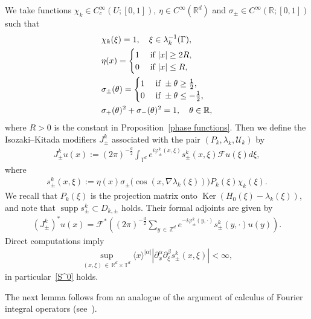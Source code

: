 \documentclass[AHL,Unicode,longabstracts,published]{cedram}
\makeatletter
\renewcommand{\a}{\alpha}
\renewcommand{\b}{\beta}
\newcommand{\f}{\varphi}
\renewcommand{\l}{\lambda}
\newcommand{\x}{\xi}
\newcommand{\s}{\sigma}
\newcommand{\R}{\mathbb{R}}
\newcommand{\Z}{\mathbb{Z}}
\newcommand{\T}{\mathbb{T}}
\newcommand{\US}{\mathcal{U}}
\newcommand{\FS}{\mathcal{F}}
\newcommand{\jap}[1]{\langle #1 \rangle}
\DeclareMathOperator{\kerr}{Ker}
\DeclareMathOperator{\supp}{supp}
\newenvironment{alcases}{\left\{\begingroup\arraycolsep=0pt\renewcommand{\arraystretch}{1.2}\begin{array}{r@{\;}l@{\quad}l}}{\end{array}\endgroup\right.}
\newcommand{\Z}{\mathbb{Z}}
\newcommand{\R}{\mathbb{R}}
\makeatother
\begin{document}
We take functions $\chi_k\in C_c^\infty(U;[0,1])$, $\eta\in C^\infty(\R^d)$ and $\s_\pm\in C^\infty(\R;[0,1])$ such that
\begin{align}
&\chi_k(\x)=1, \quad \x \in \lambda_k^{-1}(\Gamma), \label{chi 1}
\\
&\eta(x)=
\begin{alcases}
1 & \quad \text{if } |x|\geq 2R, \\
0 & \quad \text{if } |x|\leq R,
\end{alcases}\label{eta 01}
\\
&\s_\pm(\theta)=
\begin{alcases}
1 & \quad \text{if } \pm\theta \geq \frac{1}{2}, \\ 0 & \quad \text{if } \pm\theta \leq -\frac{1}{2},
\end{alcases}\label{sigma 01}
\\
&\s_+(\theta)^2+\s_-(\theta)^2=1, \quad \theta\in\R, \label{sigma sum1}
\end{align}
where $R>0$ is the constant in Proposition~\ref{phase functions}. Then we define the Isozaki--Kitada modifiers $J_\pm^k$ associated with the pair $(P_k,\l_k,\US_k)$ by
\begin{align}\label{IK1}
J_\pm^k u(x) := (2\pi)^{-\frac{d}{2}} \int_{\T^d} e^{i\f_{\pm}^k(x,\x)} s_\pm^k(x,\x) \FS u(\x) d\x,
\end{align}
where
\begin{align*}
s_\pm^k(x,\x):=\eta(x)\s_\pm\bigl(\cos(x,\nabla\l_k(\x)) \bigr) P_k(\x) \chi_k(\x).
\end{align*}
We recall that $P_k(\x)$ is the projection matrix onto $\kerr(H_0(\x)-\l_k(\x))$, and note that $\supp s_\pm^k \subset D_{k,\pm}$ holds. Their formal adjoints are given by
\begin{align*}
\left(J_\pm^k\right)^* u(x) = \FS^* \left((2\pi)^{-\frac{d}{2}} \sum_{y\,\in\,\Z^d} e^{-i\f_{\pm}^k(y,\cdot)} s_\pm^k(y,\cdot) u(y) \right).
\end{align*}
Direct computations imply
\begin{align}\label{s is in S^0}
\sup_{(x,\x)\,\in\,\R^d\times\T^d}\jap{x}^{|\a|}\left|\partial_x^\a\partial_{\x}^\b s_\pm^k(x,\x)\right| < \infty,
\end{align}
in particular~\eqref{S^0} holds.

The next lemma follows from an analogue of the argument of calculus of Fourier integral operators (see~\cite{IsoKita,T1}).
\end{document}
